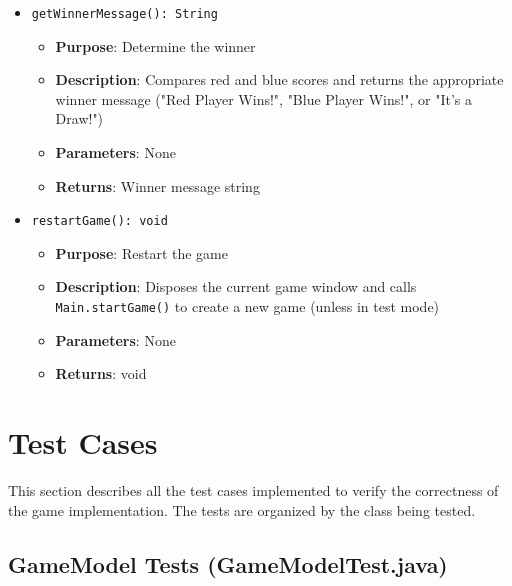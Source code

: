 \documentclass[12pt,a4paper]{article}
\begin{document}
\begin{itemize}
    \item \texttt{getWinnerMessage(): String}
    \begin{itemize}
        \item \textbf{Purpose}: Determine the winner
        \item \textbf{Description}: Compares red and blue scores and returns the appropriate winner message ("Red Player Wins!", "Blue Player Wins!", or "It's a Draw!")
        \item \textbf{Parameters}: None
        \item \textbf{Returns}: Winner message string
    \end{itemize}
    
    \item \texttt{restartGame(): void}
    \begin{itemize}
        \item \textbf{Purpose}: Restart the game
        \item \textbf{Description}: Disposes the current game window and calls \texttt{Main.startGame()} to create a new game (unless in test mode)
        \item \textbf{Parameters}: None
        \item \textbf{Returns}: void
    \end{itemize}
\end{itemize}

\newpage

\section{Test Cases}

This section describes all the test cases implemented to verify the correctness of the game implementation. The tests are organized by the class being tested.

\subsection{GameModel Tests (GameModelTest.java)}
\end{document}
